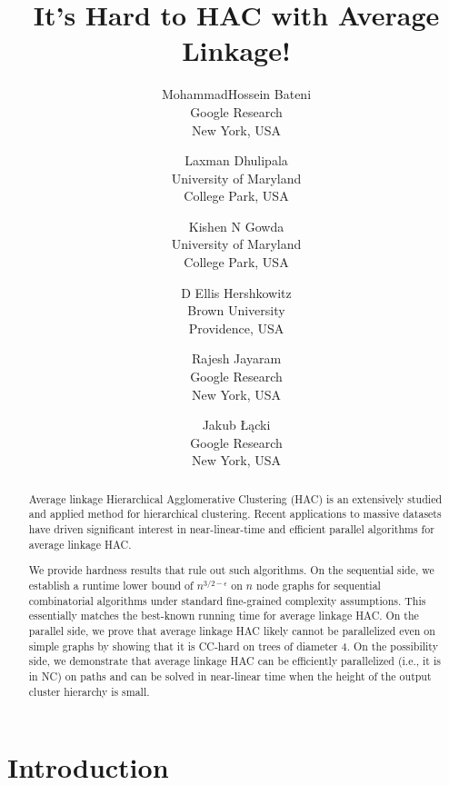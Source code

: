 \documentclass[11pt]{article}
\title{
It's Hard to HAC with Average Linkage!
}
\author{%
MohammadHossein Bateni\\%
Google Research\\%
New York, USA%
\and%
Laxman Dhulipala\\%
University of Maryland\\%
College Park, USA%
\and%
Kishen N Gowda\\%
University of Maryland\\
College Park, USA%
\and%
D Ellis Hershkowitz\\%
Brown University\\
Providence, USA%
\and%
Rajesh Jayaram\\%
Google Research\\
New York, USA%
\and%
Jakub Łącki\\%
Google Research\\
New York, USA%
}
\date{}
\begin{document}
\maketitle

\begin{abstract}
Average linkage Hierarchical Agglomerative Clustering (HAC) is an extensively studied and applied method for hierarchical clustering. Recent applications to massive datasets have driven significant interest in near-linear-time and efficient parallel algorithms for average linkage HAC.

We provide hardness results that rule out such algorithms. On the sequential side, we establish a runtime lower bound of $n^{3/2-\epsilon}$ on $n$ node graphs for sequential combinatorial algorithms under standard fine-grained complexity assumptions. This essentially matches the best-known running time for average linkage HAC. On the parallel side, we prove that average linkage HAC likely cannot be parallelized even on simple graphs by showing that it is CC-hard on trees of diameter $4$. On the possibility side, we demonstrate that average linkage HAC can be efficiently parallelized (i.e., it is in NC) on paths and can be solved in near-linear time when the height of the output cluster hierarchy is small.
\end{abstract}
\thispagestyle{empty}
\newpage
\setcounter{page}{1}

\section{Introduction}
\end{document}
